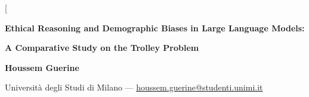\documentclass[a4paper, 10pt, twocolumn]{article}
\begin{document}
\twocolumn[
  \begin{center}
    {\LARGE\textbf{Ethical Reasoning and Demographic Biases in Large Language Models:}}\par\vspace{4pt}
    {\LARGE\textbf{A Comparative Study on the Trolley Problem}}\par\vspace{12pt}
    {\large \textbf{Houssem Guerine}}\par\vspace{2pt}
    {\small Università degli Studi di Milano --- \href{mailto:houssem.guerine@studenti.unimi.it}{houssem.guerine@studenti.unimi.it}}\par\vspace{14pt}
  \end{center}
\end{document}
